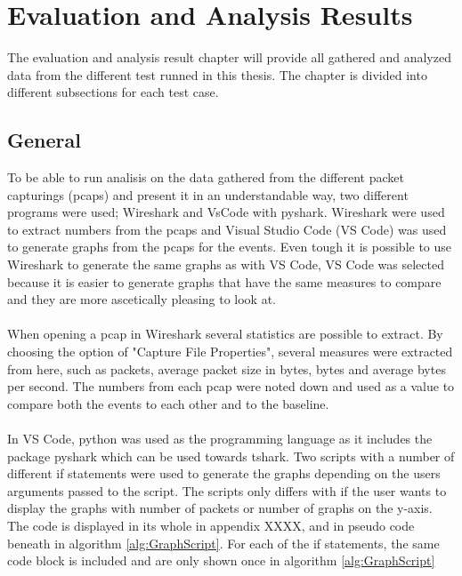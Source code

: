 \chapter{Evaluation and Analysis Results}
The evaluation and analysis result chapter will provide all gathered and analyzed data from the different test runned in this thesis. The chapter is divided into different subsections for each test case. 
\section{General}
To be able to run analisis on the data gathered from the different packet capturings (pcaps) and present it in an understandable way, two different programs were used; Wireshark and VsCode with pyshark. Wireshark were used to extract numbers from the pcaps and Visual Studio Code (VS Code) was used to generate graphs from the pcaps for the events. Even tough it is possible to use Wireshark to generate the same graphs as with VS Code, VS Code was selected because it is easier to generate graphs that have the same measures to compare and they are more ascetically pleasing to look at.  
\\\\
When opening a pcap in Wireshark several statistics are possible to extract. By choosing the option of "Capture File Properties", several measures were extracted from here, such as packets, average packet size in bytes, bytes and average bytes per second. The numbers from each pcap were noted down and used as a value to compare both the events to each other and to the baseline. 
\\\\
In VS Code, python was used as the programming language as it includes the package pyshark which can be used towards tshark. Two scripts with a number of different if statements were used to generate the graphs depending on the users arguments passed to the script. The scripts only differs with if the user wants to display the graphs with number of packets or number of graphs on the y-axis. The code is displayed in its whole in appendix XXXX, and in pseudo code beneath in algorithm \ref{alg:GraphScript}. For each of the if statements, the same code block is included and are only shown once in algorithm \ref{alg:GraphScript}

